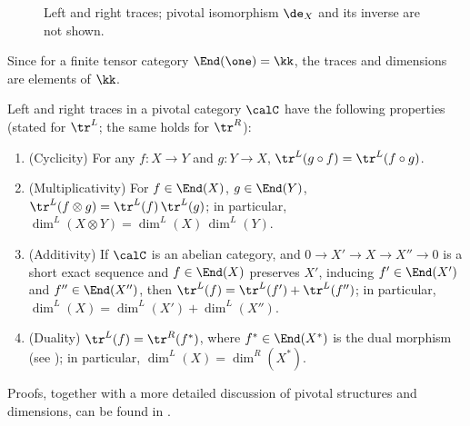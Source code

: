 \begin{figure}[ht]
\qquad


\caption{Left and right traces;
  pivotal isomorphism $\de_X$ and its inverse are not shown.}\label{f:trace}
\end{figure}
Since for a finite tensor category $\End(\one)=\kk$, the traces and dimensions
are elements of $\kk$.

\begin{lemma}\label{l:trace-properties}
  Left and right traces in a pivotal category $\calC$ have the
  following properties \textup{(}stated for $\tr^L$; the
  same holds for $\tr^R$\textup{)}:
  \begin{enumerate}
    \item \textup{(}Cyclicity\textup{)} For any $f\colon X\to Y$ and $g\colon Y\to X$,
      $\tr^L(g\circ f)=\tr^L(f\circ g)$.
    \item \textup{(}Multiplicativity\textup{)} For $f\in \End(X)$, $g\in \End(Y)$,
      $\tr^L(f\otimes g)=\tr^L(f)\,\tr^L(g)$; in particular,
      $\dim^L(X\otimes Y)=\dim^L(X)\,\dim^L(Y)$.
    \item \textup{(}Additivity\textup{)} If $\calC$ is an abelian category, and
      $0\to X'\to X\to X''\to 0$ is a short exact sequence
      and $f\in \End(X)$ preserves $X'$,  inducing $f'\in \End(X')$ and $f''\in
      \End(X'')$, then $\tr^L(f)=\tr^L(f')+\tr^L(f'')$; in particular,
      $\dim^L(X)=\dim^L(X')+\dim^L(X'')$.
    \item \textup{(}Duality\textup{)} $\tr^L(f)=\tr^R(f^*)$, where $f^*\in \End(X^*)$ is the
      dual morphism \textup{(}see \textup{)}; in
      particular,
      $\dim^L(X)=\dim^R(X^*)$.
  \end{enumerate}
\end{lemma}
Proofs, together with a more detailed discussion of pivotal structures and
dimensions, can be found in \cite[Section 4.7]{etingof-fusion}.


